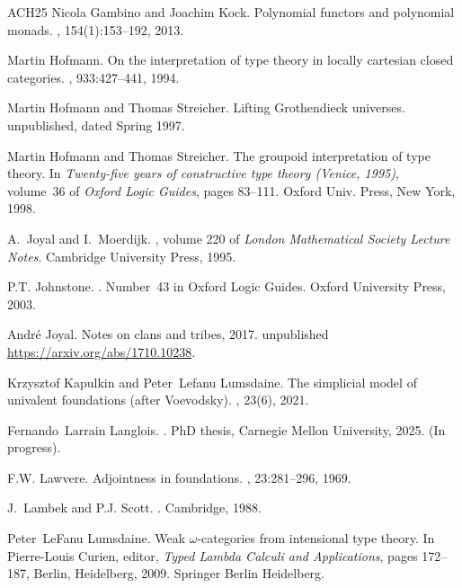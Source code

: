 \documentclass[12pt,reqno]{amsart}
\theoremstyle{remark}
\theoremstyle{definition}
\begin{document}
\begin{thebibliography}{ACH{\etalchar{+}}25}
Nicola Gambino and Joachim Kock.
\newblock Polynomial functors and polynomial monads.
, 154(1):153--192, 2013.

Martin Hofmann.
\newblock On the interpretation of type theory in locally cartesian closed
  categories.
, 933:427--441, 1994.

Martin Hofmann and Thomas Streicher.
\newblock Lifting {G}rothendieck universes.
\newblock unpublished, dated Spring 1997.

Martin Hofmann and Thomas Streicher.
\newblock The groupoid interpretation of type theory.
\newblock In {\em Twenty-five years of constructive type theory ({V}enice,
  1995)}, volume~36 of {\em Oxford Logic Guides}, pages 83--111. Oxford Univ.
  Press, New York, 1998.

A.~Joyal and I.~Moerdijk.
, volume 220 of {\em London Mathematical
  Society Lecture Notes}.
\newblock Cambridge University Press, 1995.

P.T. Johnstone.
.
\newblock Number~43 in Oxford Logic Guides. Oxford University Press, 2003.

Andr\'e Joyal.
\newblock Notes on clans and tribes, 2017.
\newblock unpublished \url{https://arxiv.org/abs/1710.10238}.

Krzysztof Kapulkin and Peter~Lefanu Lumsdaine.
\newblock The simplicial model of univalent foundations (after {V}oevodsky).
, 23(6), 2021.

Fernando~Larrain Langlois.
.
\newblock Ph{D} thesis, Carnegie Mellon University, 2025.
\newblock (In progress).

F.W. Lawvere.
\newblock Adjointness in foundations.
, 23:281--296, 1969.

J.~Lambek and P.J. Scott.
.
\newblock Cambridge, 1988.

Peter~LeFanu Lumsdaine.
\newblock Weak $\omega$-categories from intensional type theory.
\newblock In Pierre-Louis Curien, editor, {\em Typed Lambda Calculi and
  Applications}, pages 172--187, Berlin, Heidelberg, 2009. Springer Berlin
  Heidelberg.


\end{thebibliography}
\end{document}
